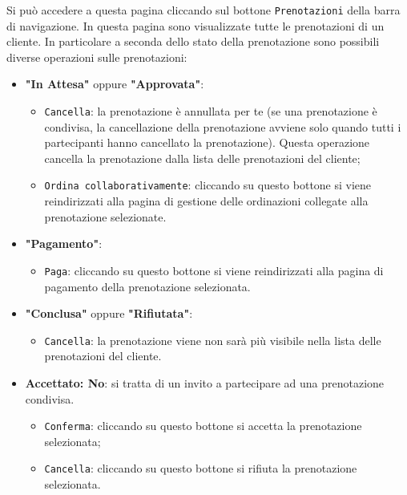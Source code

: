 Si può accedere a questa pagina cliccando sul bottone \texttt{Prenotazioni} della
barra di navigazione. In questa pagina sono visualizzate tutte le prenotazioni
di un cliente. In particolare a seconda dello stato della prenotazione sono
possibili diverse operazioni sulle prenotazioni:
\begin{itemize}
	\item \textbf{"In Attesa"} oppure \textbf{"Approvata"}: 
		\begin{itemize}
			\item \texttt{Cancella}: la prenotazione è annullata per te
				(se una prenotazione è condivisa, la cancellazione della
				prenotazione avviene solo quando tutti i partecipanti hanno cancellato
				la prenotazione). Questa operazione cancella la prenotazione
				dalla lista delle prenotazioni del cliente;

			\item \texttt{Ordina collaborativamente}: cliccando su questo
				bottone si viene reindirizzati alla pagina di gestione delle
				ordinazioni collegate alla prenotazione selezionate.
		\end{itemize}

	\item \textbf{"Pagamento"}: 
		\begin{itemize}
			\item \texttt{Paga}: cliccando su questo bottone si viene
				reindirizzati alla pagina di pagamento della prenotazione
				selezionata.
		\end{itemize}

	\item \textbf{"Conclusa"} oppure \textbf{"Rifiutata"}: 
		\begin{itemize}
			\item \texttt{Cancella}: la prenotazione viene non sarà più visibile
				nella lista delle prenotazioni del cliente.
		\end{itemize}

	\item \textbf{Accettato: No}: si tratta di un invito a partecipare ad una
		prenotazione condivisa.
		\begin{itemize}
			\item \texttt{Conferma}: cliccando su questo bottone si accetta la
				prenotazione selezionata;

			\item \texttt{Cancella}: cliccando su questo bottone si rifiuta la
				prenotazione selezionata.
		\end{itemize}
\end{itemize}

